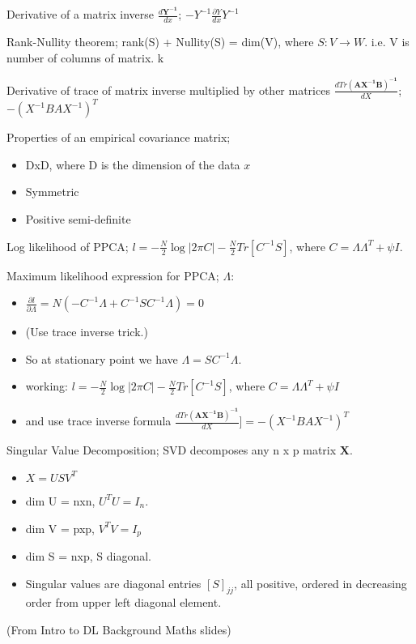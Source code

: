 \documentclass{article}
\begin{document}
Derivative of a matrix inverse $\frac{d\mathbf{Y^{-1}}}{dx}$; $-Y^{-1}\frac{\partial{Y}}{dx}Y^{-1}$

Rank-Nullity theorem; rank(S) + Nullity(S) = dim(V), where $S:V\to W$. i.e. V is number of columns of matrix. k

Derivative of trace of matrix inverse multiplied by other matrices $\frac{d Tr \mathbf{(AX^{-1}B)^{-1}}}{dX}$; $-(X^{-1}BAX^{-1})^T$

Properties of an empirical covariance matrix; \begin{itemize} \item DxD, where D is the dimension of the data $x$ \item Symmetric \item Positive semi-definite \end{itemize}

Log likelihood of PPCA; $l = -\frac{N}{2}\log|2\pi C|-\frac{N}{2}Tr[C^{-1}S]$, where $C=\Lambda\Lambda^T+\psi I$.

Maximum likelihood expression for PPCA; $\Lambda$: \begin{itemize} \item $\frac{\partial l}{\partial \Lambda} = N(-C^{-1}\Lambda+C^{-1}SC^{-1}\Lambda) = 0$ \item (Use trace inverse trick.) \item So at stationary point we have $\Lambda = SC^{-1}\Lambda$.  \item working: $l = -\frac{N}{2}\log|2\pi C|-\frac{N}{2}Tr[C^{-1}S]$, where $C=\Lambda\Lambda^T+\psi I$ \item and use trace inverse formula $\frac{d Tr \mathbf{(AX^{-1}B)^{-1}}}{dX}] = -(X^{-1}BAX^{-1})^T$ \end{itemize}

Singular Value Decomposition; SVD decomposes any n x p matrix $\mathbf{X}$.\begin{itemize} \item $X = USV^T$ \item dim U = nxn, $U^TU=I_n$.  \item dim V = pxp, $V^TV=I_p$ \item dim S = nxp, S diagonal.  \item Singular values are diagonal entries $[S]_{jj}$, all positive, ordered in decreasing order from upper left diagonal element.  \end{itemize} (From Intro to DL Background Maths slides)
\end{document}
